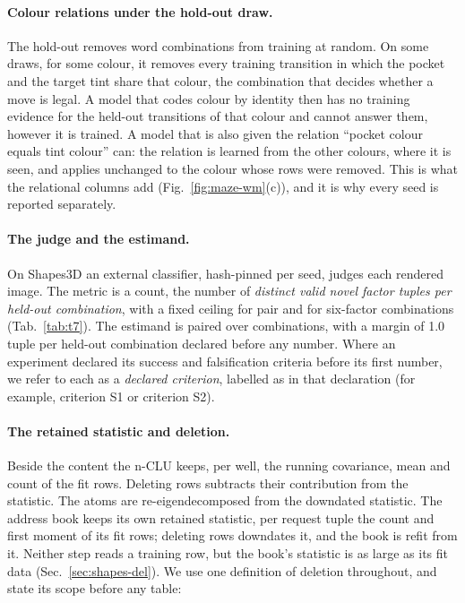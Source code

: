 \documentclass{article} %
\begin{document}
\paragraph{Colour relations under the hold-out draw.} The hold-out removes word
combinations from training at random. On some draws, for some colour, it removes every training
transition in which the pocket and the target tint share that colour, the combination that decides
whether a move is legal. A model that codes colour by identity then has no training evidence for the
held-out transitions of that colour and cannot answer them, however it is trained. A model that is
also given the relation ``pocket colour equals tint colour'' can: the relation is learned from the
other colours, where it is seen, and applies unchanged to the colour whose rows were removed. This is
what the relational columns add (Fig.~\ref{fig:maze-wm}(c)), and it is why every seed is reported
separately.

\paragraph{The judge and the estimand.} On Shapes3D an external classifier, hash-pinned per seed, judges each rendered image. The metric is a count, the number of \emph{distinct
valid novel factor tuples per held-out combination}, with a fixed ceiling for pair and for six-factor
combinations (Tab.~\ref{tab:t7}). The estimand is paired over combinations, with a margin of 1.0 tuple per held-out combination declared
before any number. %
Where an experiment declared its success and falsification criteria before its first
number, we refer to each as a \emph{declared criterion}, labelled as in that
declaration (for example, criterion S1 or criterion S2).

\paragraph{The retained statistic and deletion.} Beside the content the n-CLU keeps, per
well, the running covariance, mean and count of the fit rows. Deleting rows subtracts their
contribution from the statistic. The atoms are re-eigendecomposed from the downdated
statistic. The address book keeps its own retained statistic, per request tuple the count and first
moment of its fit rows; deleting rows downdates it, and the book is refit from it. Neither step
reads a training row, but the book's statistic is as large as its fit data
(Sec.~\ref{sec:shapes-del}). We use one definition of deletion throughout, and state its scope
before any table:
\end{document}
